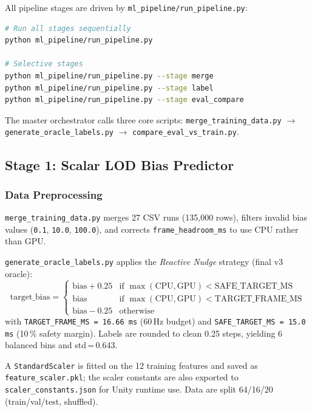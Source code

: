 \documentclass[12pt, a4paper]{article}
\begin{document}
All pipeline stages are driven by \texttt{ml\_pipeline/run\_pipeline.py}:

\begin{lstlisting}[language=bash, caption=Pipeline invocation examples]
# Run all stages sequentially
python ml_pipeline/run_pipeline.py

# Selective stages
python ml_pipeline/run_pipeline.py --stage merge
python ml_pipeline/run_pipeline.py --stage label
python ml_pipeline/run_pipeline.py --stage eval_compare
\end{lstlisting}

The master orchestrator calls three core scripts:
\texttt{merge\_training\_data.py} $\to$
\texttt{generate\_oracle\_labels.py} $\to$
\texttt{compare\_eval\_vs\_train.py}.

\subsection{Stage 1: Scalar LOD Bias Predictor}
\label{sec:stage1}

\subsubsection{Data Preprocessing}

\texttt{merge\_training\_data.py} merges 27 CSV runs (135,000 rows), filters
invalid bias values (\texttt{0.1}, \texttt{10.0}, \texttt{100.0}), and corrects
\texttt{frame\_headroom\_ms} to use CPU rather than GPU.

\texttt{generate\_oracle\_labels.py} applies the \emph{Reactive Nudge} strategy
(final v3 oracle):
\[
  \text{target\_bias} =
  \begin{cases}
    \text{bias} + 0.25 & \text{if } \max(\text{CPU}, \text{GPU}) < \text{SAFE\_TARGET\_MS}\\
    \text{bias} & \text{if } \max(\text{CPU}, \text{GPU}) < \text{TARGET\_FRAME\_MS}\\
    \text{bias} - 0.25 & \text{otherwise}
  \end{cases}
\]
with \texttt{TARGET\_FRAME\_MS\,=\,16.66\,ms} (60\,Hz budget) and
\texttt{SAFE\_TARGET\_MS\,=\,15.0\,ms} (10\,\% safety margin).
Labels are rounded to clean 0.25 steps, yielding 6 balanced bins and
std\,=\,0.643.

A \texttt{StandardScaler} is fitted on the 12 training features and saved as
\texttt{feature\_scaler.pkl}; the scaler constants are also exported to
\texttt{scaler\_constants.json} for Unity runtime use. Data are split 64/16/20
(train/val/test, shuffled).
\end{document}
